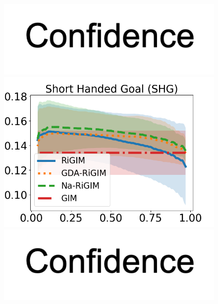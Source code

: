 \documentclass{article}
\begin{document}
\begin{figure}[htbp]
\begin{minipage}{0.16\textwidth}
    \vspace{-0.05in}
    \includegraphics[scale=0.12]{figures/confidence_x_label.png}
    \end{minipage}
    \begin{minipage}{0.16\textwidth}
    \centering
    \includegraphics[scale=0.14]{figures/risk_curve_SHG_shadow.png}\par
    \vspace{-0.05in}
    \includegraphics[scale=0.12]{figures/confidence_x_label.png}
    \end{minipage}
    \begin{minipage}{0.16\textwidth}
    \centering

\end{minipage}
\end{figure}
\end{document}
